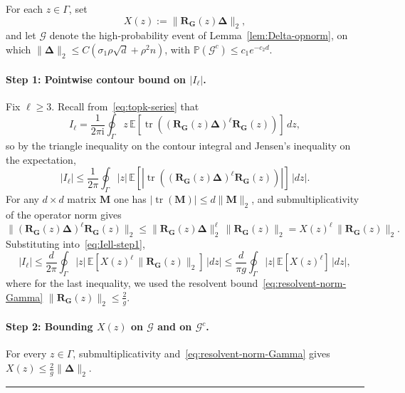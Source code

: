 \documentclass{article}
\newcommand{\twonorm}[1]{\|#1\|_2}
\newcommand{\Ex}[1]{\mbox{}\mathbb{E}\left[#1\right]}
\newcommand{\pr}[1]{\mbox{}\mathbb{P}\left(#1\right)}
\newcommand{\Gb}{\mathbf{G}}
\newcommand{\Mb}{\mathbf{M}}
\newcommand{\Rb}{\mathbf{R}}
\newcommand{\Gcal}{\mathcal{G}}
\newcommand{\BlackBox}{\rule{1.5ex}{1.5ex}}  %
\newenvironment{proof}{\par\noindent{\bf Proof\ }}{\hfill\BlackBox\par\medskip}
\newcommand{\tr}{\mathop{\mathrm{tr}}}
\newcommand{\rbr}[1]{\left(#1\right)}
\newcommand{\abr}[1]{\left|#1\right|}
\newcommand{\Deltab}{\boldsymbol{\Delta}}
\begin{document}
\begin{proof}
For each $z\in\Gamma$, set
\begin{equation*}
    X(z) := \twonorm{\Rb_\Gb(z)\Deltab},
\end{equation*}
and let $\Gcal$ denote the high-probability event of Lemma~\ref{lem:Delta-opnorm}, on which $\twonorm{\Deltab}\le C\rbr{\sigma_1\rho\sqrt d+\rho^2 n}$, with $\pr{\Gcal^c}\le c_1 e^{-c_2 d}$.

\paragraph{Step 1: Pointwise contour bound on $\abr{I_\ell}$.}
Fix $\ell\ge 3$. Recall from~\eqref{eq:topk-series} that
\begin{equation*}
    I_\ell = \frac{1}{2\pi \mathrm{i}}\oint_\Gamma z\,\Ex{\tr\rbr{(\Rb_\Gb(z)\Deltab)^\ell\Rb_\Gb(z)}}\,dz,
\end{equation*}
so by the triangle inequality on the contour integral and Jensen's inequality on the expectation,
\begin{equation}\label{eq:Iell-step1}
    \abr{I_\ell} \le \frac{1}{2\pi}\oint_\Gamma \abr{z}\,\Ex{\abr{\tr\rbr{(\Rb_\Gb(z)\Deltab)^\ell\Rb_\Gb(z)}}}\,\abr{dz}.
\end{equation}
For any $d\times d$ matrix $\Mb$ one has $\abr{\tr(\Mb)}\le d\twonorm{\Mb}$, and submultiplicativity of the operator norm gives
\begin{equation*}
    \twonorm{(\Rb_\Gb(z)\Deltab)^\ell\Rb_\Gb(z)} \le \twonorm{\Rb_\Gb(z)\Deltab}^\ell\,\twonorm{\Rb_\Gb(z)} = X(z)^\ell\,\twonorm{\Rb_\Gb(z)}.
\end{equation*}
Substituting into~\eqref{eq:Iell-step1},
\begin{equation}\label{eq:Iell-step1-final}
    \abr{I_\ell} \le \frac{d}{2\pi}\oint_\Gamma \abr{z}\,\Ex{X(z)^\ell\,\twonorm{\Rb_\Gb(z)}}\,\abr{dz} \le \frac{d}{\pi g}\oint_\Gamma \abr{z}\,\Ex{X(z)^\ell}\,\abr{dz},
\end{equation}
where for the last inequality, we used the resolvent bound~\eqref{eq:resolvent-norm-Gamma} $\twonorm{\Rb_\Gb(z) }\le \frac{2}{g}$.

\paragraph{Step 2: Bounding $X(z)$ on $\Gcal$ and on $\Gcal^c$.}
For every $z\in\Gamma$, submultiplicativity and~\eqref{eq:resolvent-norm-Gamma} gives $X(z) \le \frac{2}{g}\twonorm{\Deltab}$.


\end{proof}
\end{document}
